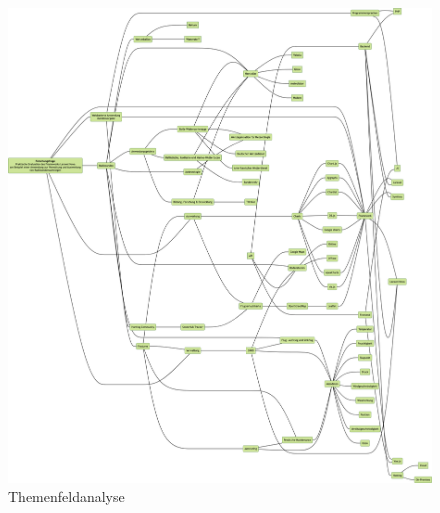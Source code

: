 \newpage
\begin{figure}[h!]
    \centering
    \caption{Themenfeldanalyse}
    \label{fig:themenfeldanalyse}
    \includegraphics[scale=0.255]{assets/themenfeldanalyse_no_padding}
\end{figure}
\newpage
